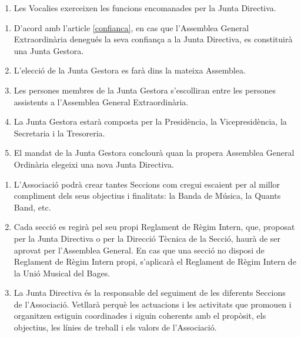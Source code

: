 \documentclass[11pt,a4paper]{article}
\newcommand{\UMB}{Unió Musical del Bages\xspace}
\newcommand{\JD}{Junta Directiva\xspace}
\newcommand{\AG}{Assemblea General\xspace}
\newcommand{\AGO}{Assemblea General Ordinària\xspace}
\newcommand{\AGE}{Assemblea General Extraordinària\xspace}
\newcommand{\DT}{Direcció Tècnica\xspace}
\newcommand{\JG}{Junta Gestora\xspace}
\DeclareRobustCommand{\RRI}{Reglament de Règim Intern\xspace}
\begin{document}

\begin{enumerate}
    \item[] Les Vocalies exerceixen les funcions encomanades per la \JD.

\end{enumerate}

\Art{La \JG}

\begin{enumerate}
    \item D'acord amb l'article \ref{confianca}, en cas que l'\AGE denegués la seva confiança a la \JD, es constituirà una \JG.
    \item L'elecció de la \JG es farà dins la mateixa Assemblea.
    \item Les persones membres de la \JG s'escolliran entre les persones assistents a l'\AGE.
    \item La \JG estarà composta per la Presidència, la Vicepresidència, la Secretaria i la Tresoreria.
    \item El mandat de la \JG conclourà quan la propera \AGO elegeixi una nova \JD.
\end{enumerate}



\begin{enumerate}
    \item L'Associació podrà crear tantes Seccions com cregui escaient per al millor compliment dels seus objectius i finalitats: la Banda de Música, la Quants Band, etc.
    \item Cada secció es regirà pel seu propi \RRI, que, proposat per la \JD o per la \DT de la Secció, haurà de ser aprovat per l'\AG. En cas que una secció no disposi de \RRI propi, s'aplicarà el \RRI de la \UMB.
    \item La \JD és la responsable del seguiment de les diferents Seccions de l'Associació. Vetllarà perquè les actuacions i les activitats que promouen i organitzen estiguin coordinades i siguin coherents amb el propòsit, els objectius, les línies de treball i els valors de l'Associació.
\end{enumerate}
\end{document}
